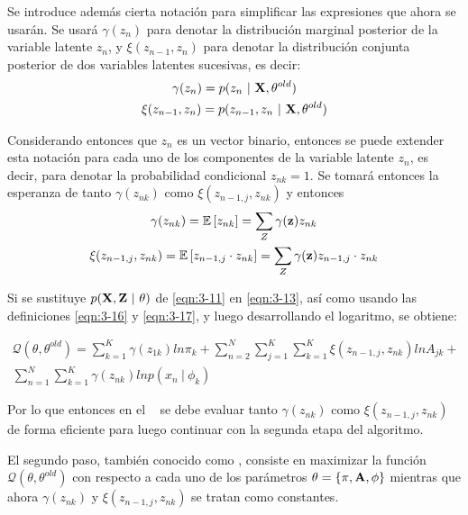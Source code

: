 Se introduce además cierta notación para simplificar las expresiones que ahora se usarán. Se usará $\gamma(z_n)$
para denotar la distribución marginal posterior de la variable latente $z_n$, y $\xi(z_{n-1}, z_n)$ para 
denotar la distribución conjunta posterior de dos variables latentes sucesivas, es decir: 
\begin{gather}
\gamma(z_n) = p(z_n ~|~ \textbf{X}, \theta^{old}) \label{eqn:3-14} \\
\xi(z_{n-1}, z_n) = p(z_{n-1}, z_n ~|~ \textbf{X}, \theta^{old}) \label{eqn:3-15}
\end{gather}

Considerando entonces que $z_n$ es un vector binario, entonces se puede extender esta notación para cada uno de los 
componentes de la variable latente $z_n$, es decir, para denotar la probabilidad condicional $z_{nk} = 1$. Se
tomará entonces la esperanza de tanto $\gamma(z_{nk})$ como $\xi(z_{n-1, j}, z_{nk})$ y entonces
\begin{gather}
\gamma(z_{nk}) = \mathbb{E} \left[ z_{nk} \right] = \sum_Z  \gamma(\textbf{z}) z_{nk} \label{eqn:3-16} \\
\xi(z_{n-1,j}, z_{nk}) = \mathbb{E} \left[z_{n-1, j} \cdot z_{nk} \right] = \sum_Z  \gamma(\textbf{z}) z_{n-1, j} 
\cdot z_{nk}
\label{eqn:3-17}
\end{gather}

Si se sustituye $p(\textbf{X}, \textbf{Z} ~|~ \theta)$ de \eqref{eqn:3-11} en \eqref{eqn:3-13}, así como usando
las definiciones \eqref{eqn:3-16} y \eqref{eqn:3-17}, y luego desarrollando el logaritmo, se obtiene: 

\begin{equation}
\begin{split}
\mathcal{Q}(\theta, \theta^{old}) = 
\sum_{k=1}^K \gamma(z_{1k}) ln \pi_k + 
\sum_{n=2}^N \sum_{j=1}^K \sum_{k=1}^K \xi(z_{n-1,j}, z_{nk}) ln A_{jk} + \\
\sum_{n=1}^N \sum_{k=1}^K \gamma(z_{nk}) ln p(x_n ~|~ \phi_k)
\label{eqn:3-18}
\end{split}
\end{equation}

Por lo que entonces en el \estep~ se debe evaluar tanto $\gamma(z_{nk})$ como $\xi(z_{n-1,j}, z_{nk})$ de forma 
eficiente para luego continuar con la segunda etapa del algoritmo.

El segundo paso, también conocido como \mstep, consiste en maximizar la función $\mathcal{Q}(\theta, \theta^{old})$
con respecto a cada uno de los parámetros $\theta = \lbrace \pi, \textbf{A}, \phi \rbrace$ mientras que ahora 
$\gamma(z_{nk})$ y $\xi(z_{n-1,j}, z_{nk})$ se tratan como constantes.

